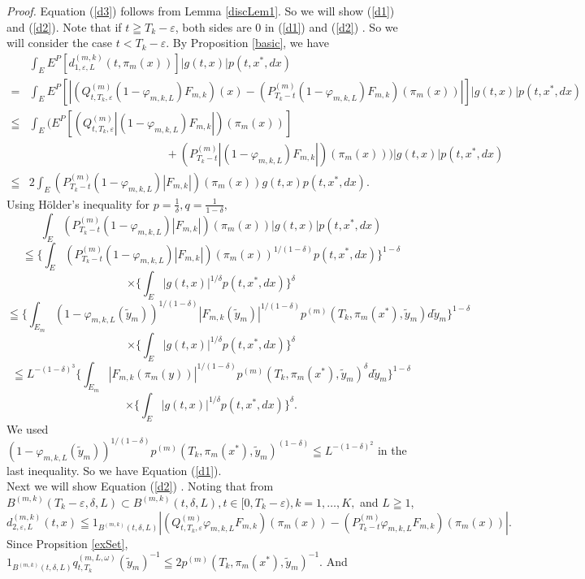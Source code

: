 \documentclass[12pt]{article}
\begin{document}
{\it Proof.}
Equation (\ref{d3}) follows from Lemma \ref{discLem1}. 
So we will show  (\ref{d1}) and (\ref{d2}). Note that if $t \geqq T_k - \varepsilon$, 
both sides are $0$ in (\ref{d1}) and (\ref{d2}) . So we will consider the case $t < T_k - \varepsilon$.
By Proposition \ref{basic}, we have
\begin{align*}
&\int_{E} E^P[d_{1,\varepsilon,L}^{(m,k)}(t,\pi_m(x))] |g(t,x)| p(t, x^*, dx)\\
= &\int_{E} E^P[|(Q_{t,T_k, \varepsilon}^{(m)}(1-\varphi_{m,k,L})F_{m,k})(x)
-(P_{T_k-t}^{(m)} (1-\varphi_{m,k,L})F_{m,k})(\pi_m(x)) |] |g(t,x)| p(t, x^*, dx) \\
\leqq &\int_{E} (E^P[(Q_{t,T_k, \varepsilon}^{(m)} |(1-\varphi_{m,k,L})F_{m,k}| )(\pi_m(x))]\\
& \qquad \qquad \qquad \qquad \qquad \qquad+ (P_{T_k-t}^{(m)} |(1-\varphi_{m,k,L})F_{m,k}| )(\pi_m(x))) |g(t,x)| p(t, x^*, dx)\\
\leqq &2 \int_{E} (P_{T_k-t}^{(m)} (1-\varphi_{m,k,L})|F_{m,k}|)(\pi_m(x)) g(t,x) p(t, x^*, dx).
\end{align*}
Using H\"{o}lder's inequality for $p=\frac{1}{\delta}, q = \frac{1}{1-\delta},$
$$\int_{E} (P_{T_k-t}^{(m)} (1-\varphi_{m,k,L})|F_{m,k}|)(\pi_m(x)) |g(t,x)| p(t, x^*, dx)$$
$$\leqq  \{\int_{E} (P_{T_k-t}^{(m)} (1-\varphi_{m,k,L})|F_{m,k}|)(\pi_m(x))^{1/(1-\delta)} p(t, x^*, dx)\}^{1-\delta}$$
$$\times \{\int_E |g(t,x)|^{1/\delta}p(t, x^*, dx)\}^{\delta}$$
$$\leqq  \{\int_{E_m}  (1-\varphi_{m,k,L}(\tilde{y}_m))^{1/(1-\delta)}|F_{m,k}(\tilde{y}_m)|^{1/(1-\delta)} p^{(m)}(T_k, \pi_m(x^*), \tilde{y}_m)d\tilde{y}_m\}^{1-\delta}$$
$$\times \{\int_E |g(t,x)|^{1/\delta}p(t, x^*, dx)\}^{\delta}$$
$$\leqq  L^{-(1-\delta)^3}\{  \int_{E_m} |F_{m,k}(\pi_m(y))|^{1/(1-\delta)} p^{(m)}(T_k, \pi_m(x^*),\tilde{y}_m)^{\delta}d\tilde{y}_m \}^{1-\delta}$$
$$\times \{\int_E |g(t,x)|^{1/\delta}p(t, x^*, dx)\}^{\delta}.$$
We used $(1-\varphi_{m,k,L}(\tilde{y}_m))^{1/(1-\delta)} p^{(m)}(T_k, \pi_m(x^*), \tilde{y}_m)^{(1-\delta)} \leqq L^{-(1-\delta)^2}$ in the last inequality.
So we have Equation (\ref{d1}).\\
Next we will show Equation (\ref{d2}) . 
Noting that from
$B^{(m,k)}(T_k-\varepsilon, \delta,L) \subset B^{(m,k)}(t, \delta,L), t \in [0,T_k-\varepsilon), k=1,\ldots,K,$ and $L \geqq 1$,
$$d_{2,\varepsilon,L}^{(m,k)}(t,x) 
\leqq 1_{B^{(m,k)}(t, \delta,L)}|(Q_{t,T_k, \varepsilon}^{(m)}\varphi_{m,k,L}F_{m,k})(\pi_m(x))
-(P_{T_k-t}^{(m)} \varphi_{m,k,L}F_{m,k})(\pi_m(x))|.$$ 
Since Propsition \ref{exSet},  
$ 1_{B^{(m,k)}(t, \delta,L)} q_{t,T_k}^{(m,L,\omega)}(\tilde{y}_m)^{-1} \leqq 2 p^{(m)}(T_k, \pi_m(x^*),\tilde{y}_m)^{-1}$. And
\end{document}
